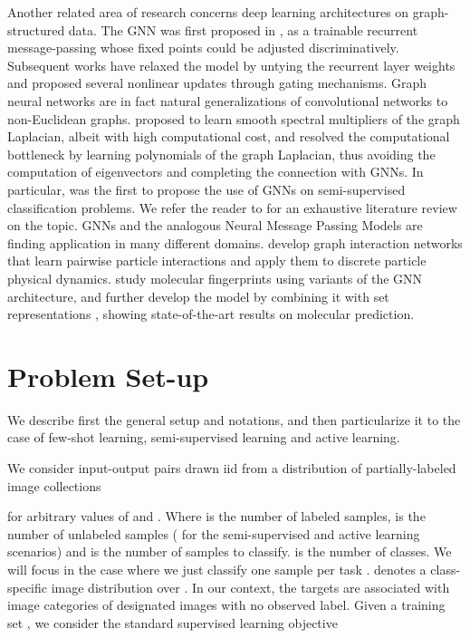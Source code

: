 \documentclass{article} \usepackage{iclr2018_conference,times}
\begin{document}
Another related area of research concerns deep learning architectures on graph-structured data. 
The GNN was first proposed in \cite{gori2005new, scarselli09}, as a trainable recurrent message-passing 
whose fixed points could be adjusted discriminatively. 
Subsequent works \cite{li2015gated, sukhbaatar2016learning} have relaxed the model by untying the recurrent layer weights and proposed several nonlinear updates through gating mechanisms. 
Graph neural networks are in fact natural generalizations of convolutional networks to non-Euclidean graphs. \cite{bruna2013spectral, henaff2015deep} proposed to learn smooth spectral multipliers of the graph Laplacian, albeit with high computational cost, and \cite{defferrard2016convolutional, kipf2016semi} resolved the computational bottleneck by learning polynomials of the graph Laplacian, thus avoiding the computation of eigenvectors and completing the connection with GNNs. In particular, \cite{kipf2016semi} 
was the first to propose the use of GNNs on semi-supervised classification problems. 
We refer the reader to \cite{bronstein2017geometric} for an exhaustive literature review on the topic. 
GNNs and the analogous Neural Message Passing Models are finding application in many different domains. \cite{battaglia2016interaction, torralba16} develop graph interaction networks that learn pairwise particle interactions and apply them to discrete particle physical dynamics. \cite{duvenaud2015convolutional, kearnes2016molecular} study molecular fingerprints using variants of the GNN architecture, and \cite{gilmer2017neural} further develop the model by combining it with set representations \cite{vinyals2015order}, showing state-of-the-art results on molecular prediction.










 \section{Problem Set-up}
\label{setupsec}

We describe first the general setup 
and notations, and then particularize it 
to the case of few-shot learning, semi-supervised 
learning and active learning. 

We consider input-output 
pairs  drawn iid from a distribution  of 
partially-labeled image collections 

 for arbitrary values of  and . Where  is the number of labeled samples,  is the number of unlabeled samples ( for the semi-supervised and active learning scenarios) and  is the number of samples to classify.  is the number of classes.  We will focus in the case  where we just classify one sample per task . 
   denotes a class-specific image distribution over .
In our context, the targets  are associated with image categories of designated images  with no observed label. 
Given a training set , we consider the standard 
supervised learning objective
\end{document}
